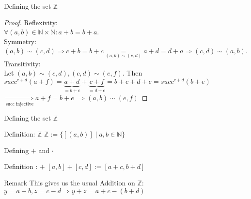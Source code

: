 \documentclass[aspectratio=169]{beamer}
\begin{document}
\begin{frame} {Defining the set $\mathbb{Z}$}
    \begin{proof}
        Reflexivity:\\ $\forall (a, b) \in \mathbb{N} \times \mathbb{N}: a+b = b+a$.\\
        Symmetry:\\ $(a, b) \sim (c, d) \Rightarrow c+b = b+c\underset{(a, b) \sim (c, d)}{=}a+d=d+a \Rightarrow (c, d) \sim (a, b)$.\\
        Transitivity: \\
        Let $(a, b) \sim (c, d), (c, d) \sim (e, f)$. Then \\
        $succ^{c+d}(a+f)= \underbrace{a+d}_{= b+c}+\underbrace{c+f}_{= d+e} = b+c+d+e=succ^{c+d}(b+e)$ \\
        $\underset{\text{succ injective}}{\Rightarrow} a+f=b+e$
        $\Rightarrow (a, b) \sim (e, f)$
    \end{proof}
\end{frame}

\begin{frame} {Defining the set $\mathbb{Z}$}
\begin{block}{Definition: $\mathbb{Z}$}
    $\mathbb{Z} := \{[(a, b)] \mid a,b \in \mathbb{N}\}$
\end{block}
\end{frame}

\begin{frame} {Defining $+$ and $\cdot$}
    \begin{block} {Definition : $+$}
        $[a, b] + [c, d] := [a+c, b+d]$
    \end{block} 

    \begin{block} {Remark}
        This gives us the usual Addition on $\mathbb{Z}$: $y = a-b, z = c - d \Rightarrow y+z = a+c - (b+d)$
    \end{block}
\end{frame}
\end{document}
